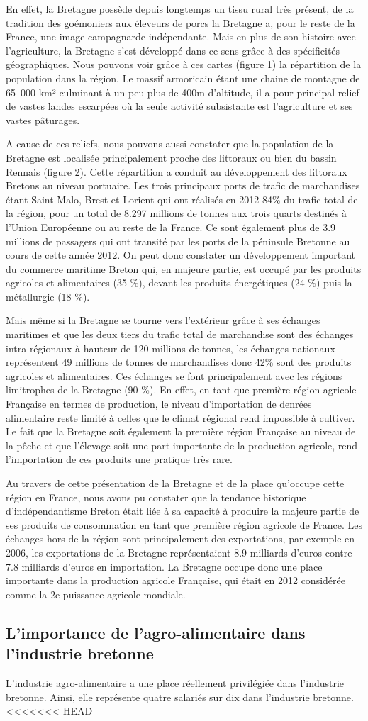 \documentclass[a4paper,10pt]{report}
\begin{document}
En effet, la Bretagne possède depuis longtemps un tissu rural très présent, de la tradition des goémoniers aux éleveurs de porcs la Bretagne a, pour le reste de la France, une image campagnarde indépendante. Mais en plus de son histoire avec l’agriculture, la Bretagne s’est développé dans ce sens grâce à des spécificités géographiques. Nous pouvons voir grâce à ces cartes (figure 1) la répartition de la population dans la région. Le massif armoricain étant une chaine de montagne de 65 000 km² culminant à un peu plus de 400m d’altitude, il a pour principal relief de vastes landes escarpées où la seule activité subsistante est l’agriculture et ses vastes pâturages.

A cause de ces reliefs, nous pouvons aussi constater que la population de la Bretagne est localisée principalement proche des littoraux ou bien du bassin Rennais (figure 2). Cette répartition a conduit au développement des littoraux Bretons au niveau portuaire. Les trois principaux ports de trafic de marchandises étant Saint-Malo, Brest et Lorient qui ont réalisés en 2012 84\% du trafic total de la région, pour un total de 8.297 millions de tonnes aux trois quarts destinés à l’Union Européenne ou au reste de la France. Ce sont également plus de 3.9 millions de passagers qui ont  transité par les ports de la péninsule Bretonne au cours de cette année 2012. On peut donc constater un développement important du commerce maritime Breton qui, en majeure partie, est occupé par les produits agricoles et alimentaires (35 \%), devant les produits énergétiques (24 \%) puis la métallurgie (18 \%).

Mais même si la Bretagne se tourne vers l’extérieur grâce à ses échanges maritimes et que les deux tiers du trafic total de marchandise sont des échanges intra régionaux à hauteur de 120 millions de tonnes, les échanges nationaux représentent 49 millions de tonnes de marchandises donc 42\% sont des produits agricoles et alimentaires. Ces échanges se font principalement avec les régions limitrophes de la Bretagne (90 \%). En effet, en tant que première région agricole Française en termes de production, le niveau d’importation de denrées alimentaire reste limité à celles que le climat régional rend impossible à cultiver. Le fait que la Bretagne soit également la première région Française au niveau de la pêche et que l’élevage soit une part importante de la production agricole, rend l’importation de ces produits une pratique très rare.

Au travers de cette présentation de la Bretagne et de la place qu’occupe cette région en France, nous avons pu constater que la tendance historique d’indépendantisme Breton était liée à sa capacité à produire la majeure partie de ses produits de consommation en tant que première région agricole de France. Les échanges hors de la région sont principalement des exportations, par exemple en 2006, les exportations de la Bretagne représentaient 8.9 milliards d’euros contre 7.8 milliards d’euros en importation. La Bretagne occupe donc une place importante dans la production agricole Française, qui était en 2012 considérée comme la 2e puissance agricole mondiale.

\subsection{L'importance de l'agro-alimentaire dans l'industrie bretonne}
L’industrie agro-alimentaire a une place réellement privilégiée dans l’industrie bretonne. Ainsi, elle représente quatre salariés sur dix dans l’industrie bretonne.
<<<<<<< HEAD
\end{document}
